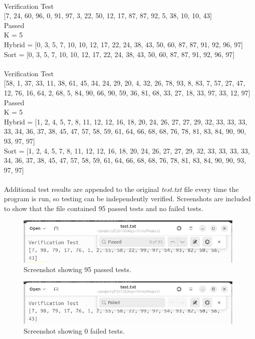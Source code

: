 \documentclass{article}
\begin{document}
\\
Verification Test \\
$[$7, 24, 60, 96, 0, 91, 97, 3, 22, 50, 12, 17, 87, 87, 92, 5, 38, 10, 10, 43$]$ \\
Passed \\
K = 5 \\
Hybrid =  $[$0, 3, 5, 7, 10, 10, 12, 17, 22, 24, 38, 43, 50, 60, 87, 87, 91, 92, 96, 97$]$ \\
Sort =  $[$0, 3, 5, 7, 10, 10, 12, 17, 22, 24, 38, 43, 50, 60, 87, 87, 91, 92, 96, 97$]$ \\
\\
Verification Test \\
$[$58, 1, 37, 33, 11, 38, 61, 45, 34, 24, 29, 20, 4, 32, 26, 78, 93, 8, 83, 7, 57, 27, 47, 12, 76, 16, 64, 2, 68, 5, 84, 90, 66, 90, 59, 36, 81, 68, 33, 27, 18, 33, 97, 33, 12, 97$]$ \\
Passed \\
K = 5 \\
Hybrid =  $[$1, 2, 4, 5, 7, 8, 11, 12, 12, 16, 18, 20, 24, 26, 27, 27, 29, 32, 33, 33, 33, 33, 34, 36, 37, 38, 45, 47, 57, 58, 59, 61, 64, 66, 68, 68, 76, 78, 81, 83, 84, 90, 90, 93, 97, 97$]$ \\
Sort =  $[$1, 2, 4, 5, 7, 8, 11, 12, 12, 16, 18, 20, 24, 26, 27, 27, 29, 32, 33, 33, 33, 33, 34, 36, 37, 38, 45, 47, 57, 58, 59, 61, 64, 66, 68, 68, 76, 78, 81, 83, 84, 90, 90, 93, 97, 97$]$ \\
\\
\rmfamily
Additional test results are appended to the original \textit{test.txt} file every time the program is run, so testing can be independently verified. Screenshots are included to show that the file contained 95 passed tests and no failed tests. 
    \begin{figure}[h!]
	\centering
	\includegraphics[width=\textwidth]{Screenshot from 2024-10-25 23-15-03.png}
	\caption{Screenshot showing 95 passed tests.}
    \end{figure}
    
    \begin{figure}[h!]
	\centering
	\includegraphics[width=\textwidth]{Screenshot from 2024-10-25 23-15-16.png}
	\caption{Screenshot showing 0 failed tests.}
    \end{figure}
	
\end{document}
